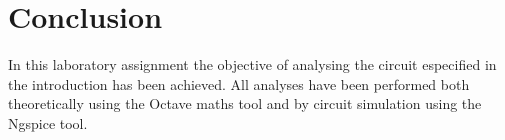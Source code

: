 \section{Conclusion}
\label{sec:conclusion}

In this laboratory assignment the objective of analysing the circuit especified in the introduction has been
achieved. All analyses have been performed both
theoretically using the Octave maths tool and by circuit simulation using the
Ngspice tool. %
